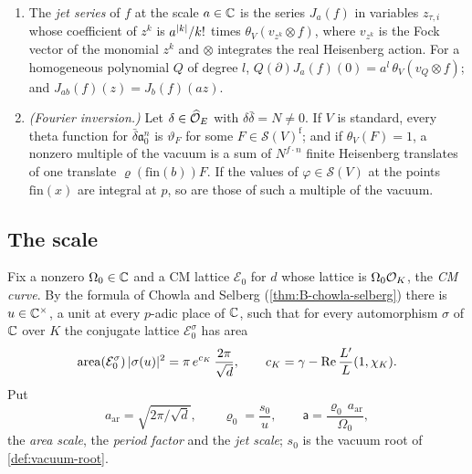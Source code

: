 \begin{enumerate}[label=\textup{(W\arabic*)}]
image of $\gamma$, whose $(\tau,i)$-coordinate is $\sqrt{2\pi/\sqrt d}\;\Phi_\tau(\gamma_i)$.
\item The \emph{jet series} of $f$ at the scale $a\in\mathbb{C}$ is the series $J_a(f)$ in variables
$z_{\tau,i}$ whose coefficient of $z^k$ is $a^{\lvert k\rvert}/k!$ times $\theta_V(v_{z^k}\otimes f)$, where
$v_{z^k}$ is the Fock vector of the monomial $z^k$ and $\otimes$ integrates the real Heisenberg
action. For a homogeneous polynomial $Q$ of degree $l$, $Q(\partial)J_a(f)(0)=a^l\,
\theta_V(v_Q\otimes f)$; and $J_{ab}(f)(z)=J_b(f)(az)$.
\item \emph{(Fourier inversion.)} Let $\delta\in\widehat{\mathcal{O}}_E$ with $\delta\bar\delta=N\ne0$. If $V$ is
standard, every theta function for $\bar\delta\mathfrak a_0^n$ is $\vartheta_F$ for some
$F\in\mathcal S(V)^{\mathrm f}$; and if $\theta_V(F)=1$, a nonzero multiple of the vacuum is a sum of
$N^{f\cdot n}$ finite Heisenberg translates of one translate $\varrho(\mathrm{fin}(b))F$. If the values
of $\varphi\in\mathcal S(V)$ at the points $\mathrm{fin}(x)$ are integral at $p$, so are those of such
a multiple of the vacuum.
\end{enumerate}

\subsection{The scale}\label{ss:vacuum-scale}
Fix a nonzero $\Omega_0\in\mathbb{C}$ and a CM lattice $\mathcal E_0$ for $d$ whose lattice is $\Omega_0\mathcal{O}_K$,
the \emph{CM curve}. By the formula of Chowla and Selberg (\cref{thm:B-chowla-selberg}) there is
$u\in\mathbb{C}^\times$, a unit at every $p$-adic place of $\mathbb{C}$, such that for every automorphism $\sigma$ of $\mathbb{C}$
over $K$ the conjugate lattice $\mathcal E_0^\sigma$ has area
\[
  \mathrm{area}(\mathcal E_0^\sigma)\,\lvert \sigma(u)\rvert^2=\pi\,e^{c_K}\,\frac{2\pi}{\sqrt d},\qquad
  c_K=\gamma-\operatorname{Re}\frac{L'}L(1,\chi_K).
\]
Put
\[
  a_{\mathrm{ar}}=\sqrt{2\pi/\sqrt d},\qquad \varrho_0=\frac{s_0}u,\qquad
  \mathsf a=\frac{\varrho_0\,a_{\mathrm{ar}}}{\Omega_0},
\]
the \emph{area scale}, the \emph{period factor} and the \emph{jet scale}; $s_0$ is the vacuum root of
\cref{def:vacuum-root}.

